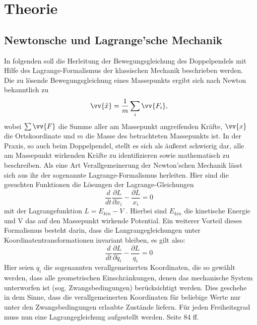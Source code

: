 \section{Theorie}
\subsection{Newtonsche und Lagrange'sche Mechanik}
In folgenden soll die Herleitung der Bewegungsgleichung des Doppelpendels mit Hilfe des Lagrange-Formalismus der klassischen Mechanik beschrieben werden. \\
Die zu lösende Bewegungsgleichung eines Massepunkts ergibt sich nach Newton bekanntlich zu \begin{equation}
\vv{\ddot{x}}=\frac{1}{m}\sum_i \vv{F_i},
\end{equation} 
wobei $ \sum \vv{F} $ die Summe aller am Massepunkt angreifenden Kräfte, $\vv{x} $ die Ortskoordinate und $ m $ die Masse des betrachteten Massepunkts ist.
In der Praxis, so auch beim Doppelpendel, stellt es sich als äußerst schwierig dar, alle am Massepunkt wirkenden Kräfte zu identifizieren sowie mathematisch zu beschreiben. Als eine Art Verallgemeinerung der Newton'schen Mechanik lässt sich aus ihr der sogenannte Lagrange-Formalismus herleiten. Hier sind die gesuchten Funktionen die Lösungen der Lagrange-Gleichungen
\begin{equation}
\frac{d}{dt}\frac{\partial L}{\partial\dot{x_i}}-\frac{\partial L}{x_i} = 0
\end{equation}
mit der Lagrangefunktion  $ L=E_{kin} - V $ . Hierbei sind $E_{kin}$ die kinetische Energie und V das auf den Massepunkt wirkende Potential. Ein weiterer Vorteil dieses Formalismus besteht darin, dass die Langrangegleichungen unter Koordinatentransformationen invariant bleiben, es gilt also:
\begin{equation}
\frac{d}{dt}\frac{\partial L}{\partial\dot{q_i}}-\frac{\partial L}{q_i} = 0
\label{lagrangegl}
\end{equation}
Hier seien $q_i$ die sogenannten verallgemeinerten Koordinaten, die so gewählt werden, dass alle geometrischen Einschränkungen, denen das mechanische System unterworfen ist (sog. Zwangsbedingungen) berücksichtigt werden. Dies geschehe in dem Sinne, dass die verallgemeinerten Koordinaten für beliebige Werte nur unter den Zwangsbedingungen erlaubte Zustände liefern. Für jeden Freiheitsgrad muss nun eine Lagrangegleichung aufgestellt werden. \cite{sch} Seite 84 ff.
